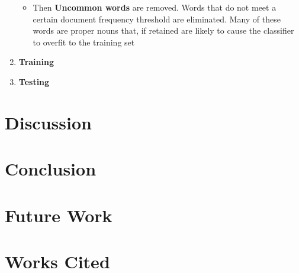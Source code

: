 \documentclass[12pt]{article}
\begin{document}
\begin{enumerate}
\begin{itemize}
            \item Then \textbf{Uncommon words} are removed. Words that do not
                meet a certain document frequency threshold are eliminated.
                Many of these words are proper nouns that, if retained are
                likely to cause the classifier to overfit to the training set

        \end{itemize}

    \item \textbf{Training}
    \item \textbf{Testing}
\end{enumerate}

\section{Discussion}

\section{Conclusion}

\section{Future Work}

\section{Works Cited}

\nocite{*}


\end{document}
